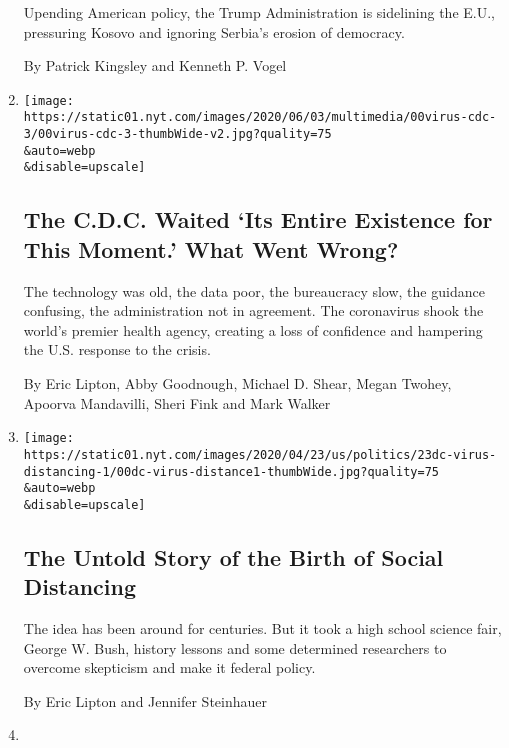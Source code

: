 \begin{enumerate}
  Upending American policy, the Trump Administration is sidelining the
  E.U., pressuring Kosovo and ignoring Serbia's erosion of democracy.

  By Patrick Kingsley and Kenneth P. Vogel
\item
  \href{/2020/06/03/us/cdc-coronavirus.html}{}

  \texttt{[image: https://static01.nyt.com/images/2020/06/03/multimedia/00virus-cdc-3/00virus-cdc-3-thumbWide-v2.jpg?quality=75\\\&auto=webp\\\&disable=upscale]}

  \hypertarget{the-cdc-waited-its-entire-existence-for-this-moment-what-went-wrong}{%
  \subsection{The C.D.C. Waited `Its Entire Existence for This Moment.'
  What Went
  Wrong?}\label{the-cdc-waited-its-entire-existence-for-this-moment-what-went-wrong}}

  The technology was old, the data poor, the bureaucracy slow, the
  guidance confusing, the administration not in agreement. The
  coronavirus shook the world's premier health agency, creating a loss
  of confidence and hampering the U.S. response to the crisis.

  By Eric Lipton, Abby Goodnough, Michael D. Shear, Megan Twohey,
  Apoorva Mandavilli, Sheri Fink and Mark Walker
\item
  \href{/2020/04/22/us/politics/social-distancing-coronavirus.html}{}

  \texttt{[image: https://static01.nyt.com/images/2020/04/23/us/politics/23dc-virus-distancing-1/00dc-virus-distance1-thumbWide.jpg?quality=75\\\&auto=webp\\\&disable=upscale]}

  \hypertarget{the-untold-story-of-the-birth-of-social-distancing}{%
  \subsection{The Untold Story of the Birth of Social
  Distancing}\label{the-untold-story-of-the-birth-of-social-distancing}}

  The idea has been around for centuries. But it took a high school
  science fair, George W. Bush, history lessons and some determined
  researchers to overcome skepticism and make it federal policy.

  By Eric Lipton and Jennifer Steinhauer
\item
  \href{/2020/04/11/us/politics/coronavirus-red-dawn-emails-trump.html}{}


\end{enumerate}
